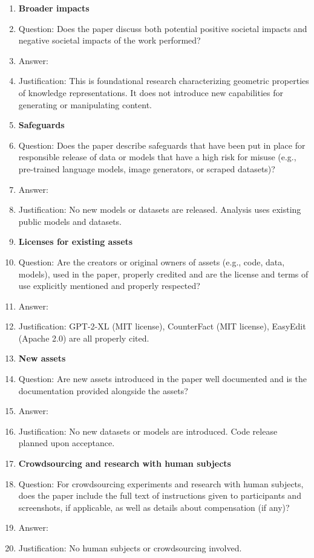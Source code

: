 \begin{enumerate}
\item {\bf Broader impacts}
    \item[] Question: Does the paper discuss both potential positive societal impacts and negative societal impacts of the work performed?
    \item[] Answer: \answerNA{}
    \item[] Justification: This is foundational research characterizing geometric properties of knowledge representations. It does not introduce new capabilities for generating or manipulating content.

\item {\bf Safeguards}
    \item[] Question: Does the paper describe safeguards that have been put in place for responsible release of data or models that have a high risk for misuse (e.g., pre-trained language models, image generators, or scraped datasets)?
    \item[] Answer: \answerNA{}
    \item[] Justification: No new models or datasets are released. Analysis uses existing public models and datasets.

\item {\bf Licenses for existing assets}
    \item[] Question: Are the creators or original owners of assets (e.g., code, data, models), used in the paper, properly credited and are the license and terms of use explicitly mentioned and properly respected?
    \item[] Answer: \answerYes{}
    \item[] Justification: GPT-2-XL (MIT license), CounterFact (MIT license), EasyEdit (Apache 2.0) are all properly cited.

\item {\bf New assets}
    \item[] Question: Are new assets introduced in the paper well documented and is the documentation provided alongside the assets?
    \item[] Answer: \answerNA{}
    \item[] Justification: No new datasets or models are introduced. Code release planned upon acceptance.

\item {\bf Crowdsourcing and research with human subjects}
    \item[] Question: For crowdsourcing experiments and research with human subjects, does the paper include the full text of instructions given to participants and screenshots, if applicable, as well as details about compensation (if any)?
    \item[] Answer: \answerNA{}
    \item[] Justification: No human subjects or crowdsourcing involved.


\end{enumerate}
